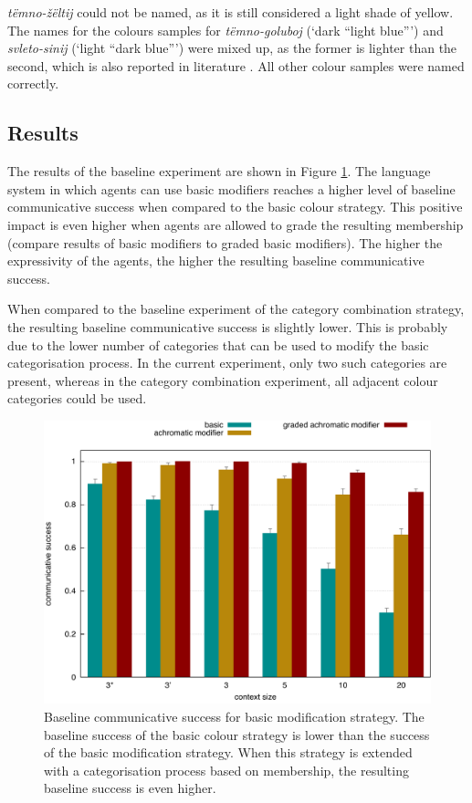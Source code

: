 \textit{t\"emno-\v z\"eltij} could not be
named, as it is still considered a light shade of yellow. The names
for the colours samples for \textit{t\"emno-goluboj} (`dark ``light blue''')
and \textit{svleto-sinij} (`light ``dark blue''') were mixed up, as the former
is lighter than the second, which is also reported in literature
\citep{safuanova07russian}. All other colour samples were named
correctly.

\subsection{Results}

The results of the baseline experiment are shown in Figure
\ref{f:ams-baseline}. The language system in which agents can use
basic modifiers reaches a higher level of baseline communicative
success when compared to the basic colour strategy. This
positive impact is even higher when agents are allowed to grade the
resulting membership (compare results of basic modifiers to
graded basic modifiers). The higher the expressivity of the
agents, the higher the resulting baseline communicative success.

When compared to the baseline experiment of the category
  combination strategy, the resulting baseline communicative success
is slightly lower. This is probably due to the lower number of
categories that can be used to modify the basic categorisation
process. In the current experiment, only two such categories are
present, whereas in the category combination experiment, all
adjacent colour categories could be used.

\begin{figure}[htpb]
  \centering
  \includegraphics[width=.8\textwidth]{./achromatic/figures/baseline.pdf}
  \caption[Baseline communicative success for basic modification
  strategy]{Baseline communicative success for basic modification
    strategy. The baseline success of the basic colour strategy is
    lower than the success of the basic modification strategy. When
    this strategy is extended with a categorisation process based on
    membership, the resulting baseline success is even higher.}
  \label{f:ams-baseline}
\end{figure}

